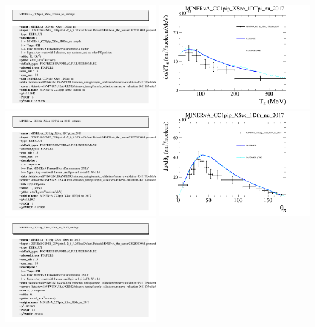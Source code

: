 \documentclass{article}
\begin{document}
\includegraphics[width=0.49\textwidth]{figures/nuisance_MINERvA_CCNpip_XSec_1DEnu_nu_info.png}
\centering
\includegraphics[width=0.49\textwidth]{figures/nuisance_MINERvA_CC1pip_XSec_1DTpi_nu_2017_comp.png}
\includegraphics[width=0.49\textwidth]{figures/nuisance_MINERvA_CC1pip_XSec_1DTpi_nu_2017_info.png}
\centering
\includegraphics[width=0.49\textwidth]{figures/nuisance_MINERvA_CC1pip_XSec_1Dth_nu_2017_comp.png}
\includegraphics[width=0.49\textwidth]{figures/nuisance_MINERvA_CC1pip_XSec_1Dth_nu_2017_info.png}
\end{document}

